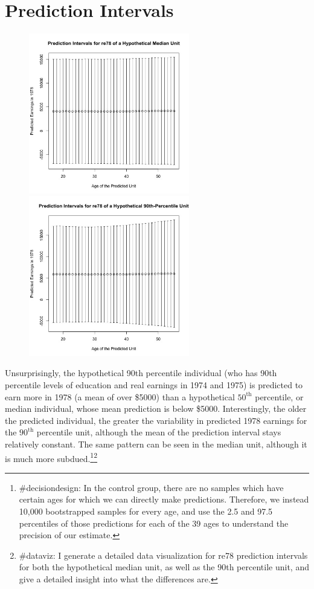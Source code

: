 \documentclass[11pt, oneside]{article}
\begin{document}
\section*{Prediction Intervals}
\begin{figure}[h]
	\includegraphics[width = 7cm, height = 7cm]{medianplot.jpg}
	\includegraphics[width = 7cm, height = 7cm]{ninetyplot.jpg}
\end{figure}
Unsurprisingly, the hypothetical 90th percentile individual (who has 90th percentile levels of education and real earnings in 1974 and 1975) is predicted to earn more in 1978 (a mean of over \$5000) than a hypothetical $50^\textrm{th}$ percentile, or median individual, whose mean prediction is below \$5000. Interestingly, the older the predicted individual, the greater the variability in predicted 1978 earnings for the $90^\textrm{th}$ percentile unit, although the mean of the prediction interval stays relatively constant. The same pattern can be seen in the median unit, although it is much more subdued.\footnote{\#decisiondesign: In the control group, there are no samples which have certain ages for which we can directly make predictions. Therefore, we instead 10,000 bootstrapped samples for every age, and use the 2.5 and 97.5 percentiles of those predictions  for each of the 39 ages to understand the precision of our estimate.}\footnote{\#dataviz: I generate a detailed data visualization for re78 prediction intervals for both the hypothetical median unit, as well as the 90th percentile unit, and give a detailed insight into what the differences are.}
\newpage
\end{document}
